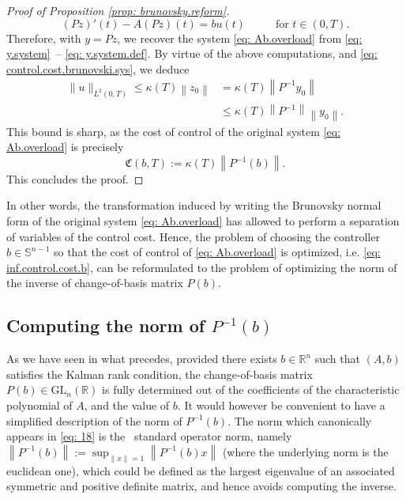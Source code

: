 \documentclass[11pt, a4paper, reqno]{amsart}
\newcommand{\R}{\mathbb{R}}
\theoremstyle{plain}
\numberwithin{equation}{section}
\begin{document}
\begin{proof}[Proof of Proposition \ref{prop: brunovsky.reform}]
	\begin{equation}
	(P z)'(t) - A (Pz)(t)  = bu(t) \hspace{1cm} \text{ for } t\in(0,T).
	\end{equation}
	Therefore, with $y=Pz$, we recover the system \eqref{eq: Ab.overload} from \eqref{eq: y.system} -- \eqref{eq: y.system.def}.
	By virtue of the above computations, and \eqref{eq: control.cost.brunovski.sys}, we deduce
	\begin{align*}
	\|u\|_{L^2(0,T)} \leqslant \kappa(T) \left\|z_0\right\| &= \kappa(T) \left\|P^{-1}y_0\right\|\nonumber \\
	&\leqslant \kappa(T) \left\|P^{-1}\right\| \left\|y_0\right\|.
	\end{align*}
	This bound is sharp, as the cost of control of the original system \eqref{eq: Ab.overload} is precisely
	\begin{equation*}
	\mathfrak{C}(b,T) := \kappa(T) \left\|P^{-1}(b)\right\|.
	\end{equation*}
	This concludes the proof.
	\end{proof}
	
	\noindent
	In other words, the transformation induced by writing the Brunovsky normal form of the original system \eqref{eq: Ab.overload} has allowed to perform a separation of variables of the control cost. Hence, the problem of choosing the controller $b\in\mathbb{S}^{n-1}$ so that the cost of control of \eqref{eq: Ab.overload} is optimized, i.e. \eqref{eq: inf.control.cost.b}, can be reformulated to the problem of optimizing the norm of the inverse of change-of-basis matrix $P(b)$.
	
	\subsection{Computing the norm of $P^{-1}(b)$} 
	As we have seen in what precedes, provided there exists $b\in\R^n$ such that $(A,b)$ satisfies the Kalman rank condition, the change-of-basis matrix
	$
	P(b) \in \mathrm{GL}_n(\R)
	$
	is fully determined out of the coefficients of the characteristic polynomial of $A$, and the value of $b$.
	It would however be convenient to have a simplified description of the norm of $P^{-1}(b)$. 
	The norm which canonically appears in \eqref{eq: 18} is the  standard operator norm, namely $\left\|P^{-1}(b)\right\| := \sup_{\|x\|=1} \left\|P^{-1}(b)x\right\|$ (where the underlying norm is the euclidean one), which could be defined as the largest eigenvalue of an associated symmetric and positive definite matrix, and hence avoids computing the inverse.
	
\end{document}
